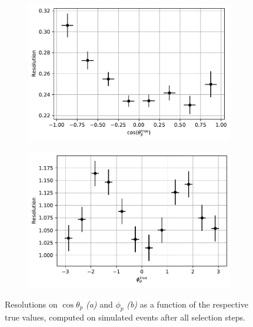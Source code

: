 \begin{figure}[t]
	\centering
	\begin{subfigure}{.45\textwidth}
		\includegraphics[height=.2\textheight]{graphics/05-angular_distributions/MCRECO_p_theta_resolution.pdf}
		\caption{}
		\label{fig:5:MCRECO_p_theta_resolution}
	\end{subfigure}
	\begin{subfigure}{.45\textwidth}
		\includegraphics[height=.2\textheight]{graphics/05-angular_distributions/MCRECO_p_phi_resolution.pdf}
		\caption{}
		\label{fig:5:MCRECO_p_phi_resolution}
	\end{subfigure}
	\caption{Resolutions on $\cos\theta_p$ \textit{(a)} and $\phi_p$ \textit{(b)} as a function of the respective true values, computed on simulated \demonstratorshort events after all selection steps.}
	\label{fig:5:angular_resolutions}
\end{figure}

